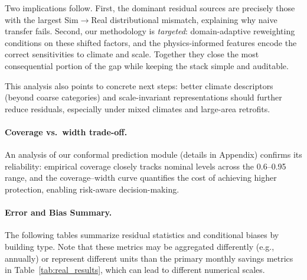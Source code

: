 ﻿\documentclass{article}
\begin{document}
Two implications follow. First, the dominant residual sources are precisely those with the largest Sim$\rightarrow$Real distributional mismatch, explaining why naive transfer fails. Second, our methodology is \emph{targeted}: domain-adaptive reweighting conditions on these shifted factors, and the physics-informed features encode the correct sensitivities to climate and scale. Together they close the most consequential portion of the gap while keeping the stack simple and auditable.

This analysis also points to concrete next steps: better climate descriptors (beyond coarse categories) and scale-invariant representations should further reduce residuals, especially under mixed climates and large-area retrofits.

\paragraph{Coverage vs.\ width trade-off.}
An analysis of our conformal prediction module (details in Appendix) confirms its reliability: empirical coverage closely tracks nominal levels across the 0.6--0.95 range, and the coverage--width curve quantifies the cost of achieving higher protection, enabling risk-aware decision-making.

\paragraph{Error and Bias Summary.}
The following tables summarize residual statistics and conditional biases by building type. Note that these metrics may be aggregated differently (e.g., annually) or represent different units than the primary monthly savings metrics in Table~\ref{tab:real_results}, which can lead to different numerical scales.



\end{document}
